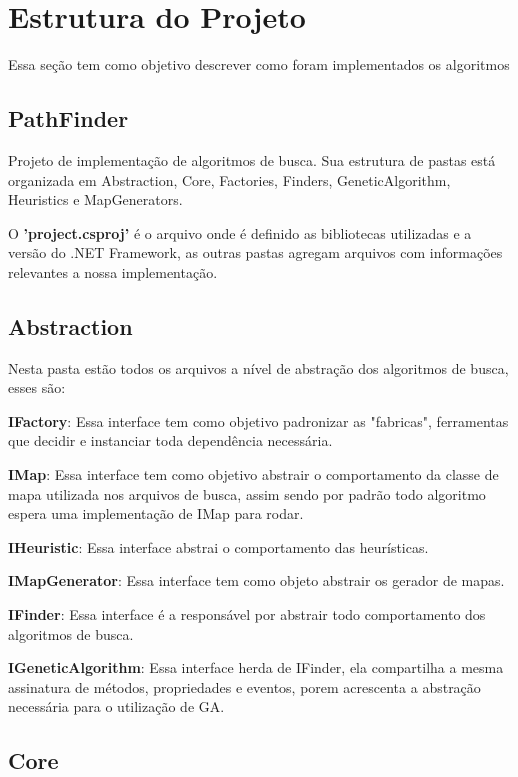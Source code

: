 \section{Estrutura do Projeto}

Essa seção tem como objetivo descrever como foram implementados os algoritmos 

\subsection {PathFinder}

Projeto de implementação de algoritmos de busca.
Sua estrutura de pastas está organizada em Abstraction, Core, Factories, Finders, GeneticAlgorithm, Heuristics e MapGenerators.

O \textbf{'project.csproj'} é o arquivo onde é definido as bibliotecas utilizadas e a versão do .NET Framework, as outras pastas agregam arquivos com informações relevantes a nossa implementação.

\subsection{Abstraction}	

Nesta pasta estão todos os arquivos a nível de abstração dos algoritmos de busca, esses são:

\textbf{IFactory}: Essa interface tem como objetivo padronizar as "fabricas", ferramentas que decidir e instanciar toda dependência necessária.

\textbf{IMap}: Essa interface tem como objetivo abstrair o comportamento da classe de mapa utilizada nos arquivos de busca, assim sendo por padrão todo algoritmo espera uma implementação de IMap para rodar.

\textbf{IHeuristic}: Essa interface abstrai o comportamento das heurísticas.

\textbf{IMapGenerator}: Essa interface tem como objeto abstrair os gerador de mapas.

\textbf{IFinder}: Essa interface é a responsável por abstrair todo comportamento dos algoritmos de busca.

\textbf{IGeneticAlgorithm}: Essa interface herda de IFinder, ela compartilha a mesma assinatura de métodos, propriedades e eventos, porem acrescenta a abstração necessária para
o utilização de GA.


\subsection{Core}

